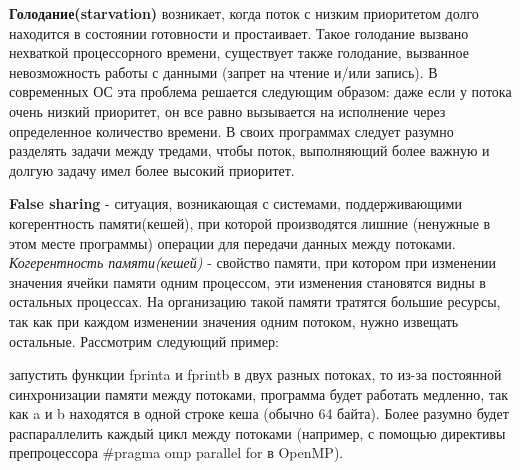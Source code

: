 {	\par\textbf{Голодание(starvation)} возникает, когда поток с низким приоритетом долго находится в состоянии готовности и простаивает. Такое голодание вызвано нехваткой процессорного времени, существует также голодание, вызванное невозможность работы с данными (запрет на чтение и/или запись). В современных ОС эта проблема решается следующим образом: даже если у потока очень низкий приоритет, он все равно вызывается на исполнение через определенное количество времени. В своих программах следует разумно разделять задачи между тредами, чтобы поток, выполняющий более важную и долгую задачу имел более высокий приоритет.
	\par\textbf{False sharing} - ситуация, возникающая с системами, поддерживающими когерентность памяти(кешей), при которой производятся лишние (ненужные в этом месте программы) операции для передачи данных между потоками. \textit{Когерентность памяти(кешей)} - свойство памяти, при котором при изменении значения ячейки памяти одним процессом, эти изменения становятся видны в остальных процессах. На организацию такой памяти тратятся большие ресурсы, так как при каждом изменении значения одним потоком, нужно извещать остальные. Рассмотрим следующий пример: 
	\begin{figure}[H]
		
	\end{figure}
	 запустить функции fprint\textunderscore a и fprint\textunderscore b в двух разных потоках, то из-за постоянной синхронизации памяти между потоками, программа будет работать медленно, так как a и b находятся в одной строке кеша (обычно 64 байта). Более разумно будет распараллелить каждый цикл между потоками (например, с помощью директивы препроцессора \#pragma omp parallel for в OpenMP).
}